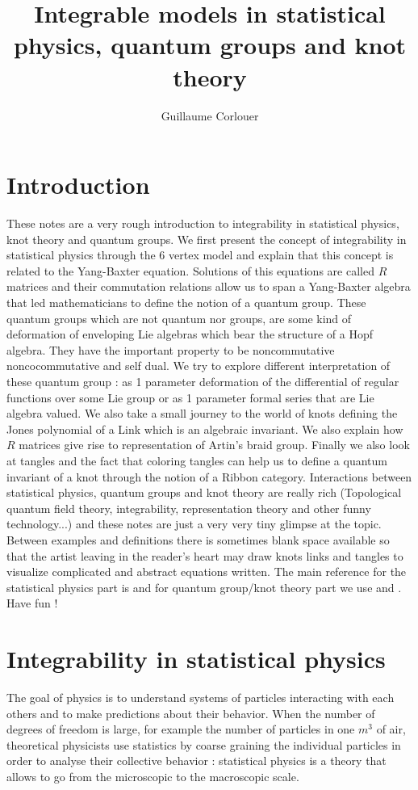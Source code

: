 \documentclass{article}
\author{Guillaume Corlouer}
\title{Integrable models in statistical physics, quantum groups and knot theory}
\theoremstyle{definition}
\begin{document}
\maketitle
\pagebreak
\tableofcontents
\pagebreak
\section{Introduction}
These notes are a very rough introduction to integrability in statistical physics, knot theory and quantum groups. We first present the concept of integrability in statistical physics through the 6 vertex model and explain that this concept is related to the Yang-Baxter equation. Solutions of this equations are called $R$ matrices and their commutation relations allow us to span a Yang-Baxter algebra that led mathematicians to define the notion of a quantum group. These quantum groups which are not quantum nor groups, are some kind of deformation of enveloping Lie algebras which bear the structure of a Hopf algebra. They have the important property to be noncommutative noncocommutative and self dual. We try to explore different interpretation of these quantum group : as 1 parameter deformation of the differential of regular functions over some Lie group or as 1 parameter formal series that are Lie algebra valued. We also take a small journey to the world of knots defining the Jones polynomial of a Link which is an algebraic invariant. We also explain how $R$ matrices give rise to representation of Artin's braid group. Finally we also look at tangles and the fact that coloring tangles can help us to define a quantum invariant of a knot through the notion of a Ribbon category. Interactions between statistical physics, quantum groups and knot theory are really rich (Topological quantum field theory, integrability, representation theory and other funny technology...) and these notes are just a very very tiny glimpse at the topic. Between examples and definitions there is sometimes blank space available so that the artist leaving in the reader's heart may draw knots links and tangles to visualize complicated and abstract equations written. The main reference for the statistical physics part is \cite{GomezRuizSierra} and for quantum group/knot theory part we  use \cite{Kassel} and \cite{KasRossTur}. Have fun ! 
\pagebreak
\section{Integrability in statistical physics}
The goal of physics is to understand systems of particles interacting with each others and to make predictions about their behavior. When the number of degrees of freedom is large, for example the number of particles in one $m^3$ of air, theoretical physicists use statistics by coarse graining the individual particles in order to analyse their collective behavior : statistical physics is a theory that allows to go from the microscopic to the macroscopic scale.\vspace{0.5cm} 
\end{document}

